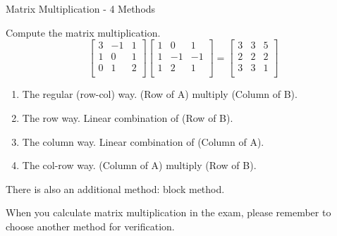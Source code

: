 \documentclass{beamer}
\begin{document}
\begin{frame}{Matrix Multiplication - 4 Methods}
\begin{examples}
Compute the matrix multiplication.
    \begin{equation*}
        \left[ \begin{matrix}
            3&		-1&       1\\
            1&		 0&       1\\
            0&		 1&       2\\
        \end{matrix} \right] \left[ \begin{matrix}
            1&		 0&       1\\
            1&		-1&      -1\\
            1&		 2&       1\\
        \end{matrix} \right] =\left[ \begin{matrix}
            3&		 3&       5\\
            2&		 2&       2\\
            3&		 3&       1\\
        \end{matrix} \right]
    \end{equation*}
\end{examples}




\begin{enumerate}
    \item The regular (row-col) way. (Row of A) multiply (Column of B).
    \item The row way. Linear combination of (Row of B).
    \item The column way. Linear combination of (Column of A).
    \item The col-row way. (Column of A) multiply (Row of B).
\end{enumerate}

There is also an additional method: block method.

\vspace{3pt}
When you calculate matrix multiplication in the exam, please remember to choose another method for verification.
\end{frame}
\end{document}

